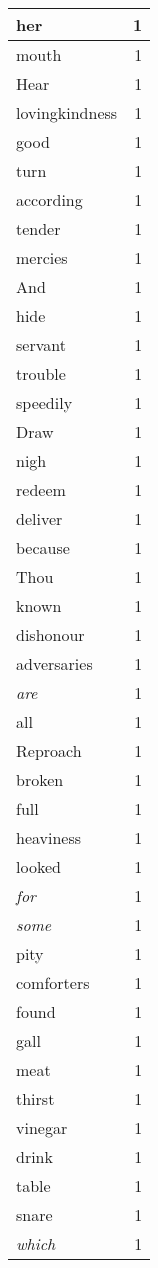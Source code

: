 \begin{center}
\begin{longtable}{l|r}
her & 1\\ \hline 
mouth & 1\\ \hline 
Hear & 1\\ \hline 
lovingkindness & 1\\ \hline 
good & 1\\ \hline 
turn & 1\\ \hline 
according & 1\\ \hline 
tender & 1\\ \hline 
mercies & 1\\ \hline 
And & 1\\ \hline 
hide & 1\\ \hline 
servant & 1\\ \hline 
trouble & 1\\ \hline 
speedily & 1\\ \hline 
Draw & 1\\ \hline 
nigh & 1\\ \hline 
redeem & 1\\ \hline 
deliver & 1\\ \hline 
because & 1\\ \hline 
Thou & 1\\ \hline 
known & 1\\ \hline 
dishonour & 1\\ \hline 
adversaries & 1\\ \hline 
\emph{are} & 1\\ \hline 
all & 1\\ \hline 
Reproach & 1\\ \hline 
broken & 1\\ \hline 
full & 1\\ \hline 
heaviness & 1\\ \hline 
looked & 1\\ \hline 
\emph{for} & 1\\ \hline 
\emph{some} & 1\\ \hline 
pity & 1\\ \hline 
comforters & 1\\ \hline 
found & 1\\ \hline 
gall & 1\\ \hline 
meat & 1\\ \hline 
thirst & 1\\ \hline 
vinegar & 1\\ \hline 
drink & 1\\ \hline 
table & 1\\ \hline 
snare & 1\\ \hline 
\emph{which} & 1\\ \hline 

\end{longtable}
\end{center}
